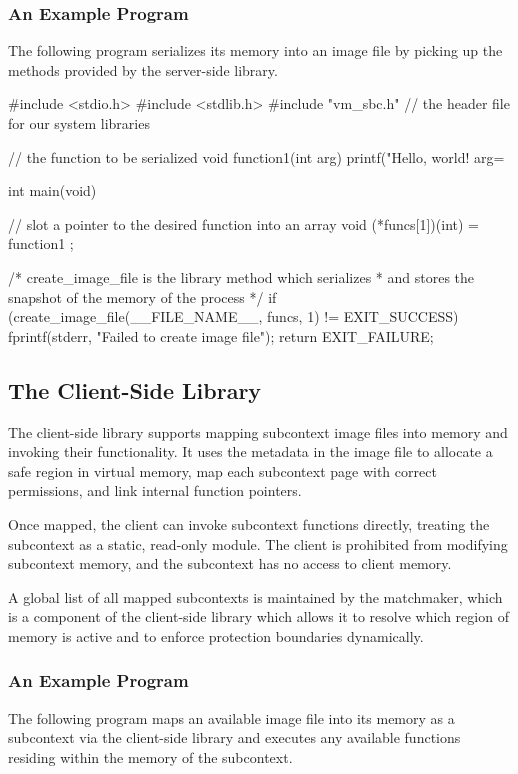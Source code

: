 \newpage
\subsubsection*{An Example Program}
The following program serializes its memory into an image file by picking up the methods provided by the server-side library.

\begin{ccode}
#include <stdio.h>
#include <stdlib.h>
#include "vm_sbc.h" // the header file for our system libraries

// the function to be serialized
void function1(int arg) {
	printf("Hello, world! arg=%
}

int main(void) {
	// slot a pointer to the desired function into an array
	void (*funcs[1])(int) = { function1 };

	/* create_image_file is the library method which serializes
	 * and stores the snapshot of the memory of the process
	 */
	if (create_image_file(__FILE_NAME__, funcs, 1) != EXIT_SUCCESS) {
		fprintf(stderr, "Failed to create image file\n");
		return EXIT_FAILURE;
	}
}
\end{ccode}

\subsection*{The Client-Side Library}
The client-side library supports mapping subcontext image files into memory and invoking their functionality. It uses the metadata in the image file to allocate a safe region in virtual memory, map each subcontext page with correct permissions, and link internal function pointers.

Once mapped, the client can invoke subcontext functions directly, treating the subcontext as a static, read-only module. The client is prohibited from modifying subcontext memory, and the subcontext has no access to client memory.

A global list of all mapped subcontexts is maintained by the matchmaker, which is a component of the client-side library which allows it to resolve which region of memory is active and to enforce protection boundaries dynamically.

\subsubsection*{An Example Program}
The following program maps an available image file into its memory as a subcontext via the client-side library and executes any available functions residing within the memory of the subcontext.

